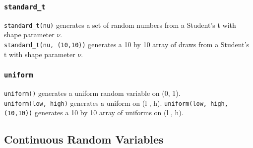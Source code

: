 \documentclass[Pydata.tex]{subfiles}
\begin{document}
\subsubsection{\texttt{standard\_t}}
\texttt{standard\_t(nu)} generates a set of random numbers from a Student’s t with shape parameter $\nu$.\\ \texttt{standard\_t(nu, (10,10))}
generates a 10 by 10 array of draws from a Student’s t with shape parameter $\nu$.
\subsubsection{\texttt{uniform}}
\texttt{uniform()} generates a uniform random variable on (0, 1). \\ \texttt{uniform(low, high)} generates a uniform on
(l , h). \texttt{uniform(low, high, (10,10))} generates a 10 by 10 array of uniforms on (l , h).
\newpage


\subsection{Continuous Random Variables}
\end{document}
